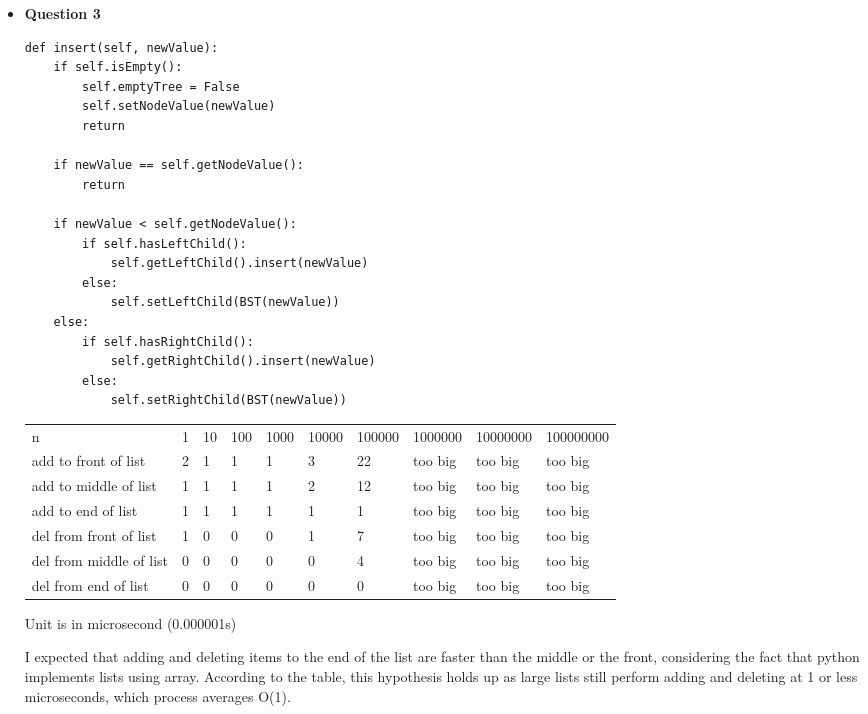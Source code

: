 \documentclass{article}
\begin{document}
\begin{itemize}
\begin{enumerate}
        \end{enumerate}

    \item\textbf{ Question 3}

    \begin{lstlisting}
def insert(self, newValue):
    if self.isEmpty():
        self.emptyTree = False
        self.setNodeValue(newValue)
        return

    if newValue == self.getNodeValue():
        return

    if newValue < self.getNodeValue():
        if self.hasLeftChild():
            self.getLeftChild().insert(newValue)
        else:
            self.setLeftChild(BST(newValue))
    else:
        if self.hasRightChild():
            self.getRightChild().insert(newValue)
        else:
            self.setRightChild(BST(newValue))

    \end{lstlisting}
    \pagebreak
    \begin{table}[]
        \begin{tabular}{llllllllll}
            n                       & 1 & 10 & 100 & 1000 & 10000 & 100000 & 1000000 & 10000000 & 100000000 \\
            add to front of list    & 2 & 1  & 1   & 1    & 3     & 22     & too big & too big  & too big   \\
            add to middle of list   & 1 & 1  & 1   & 1    & 2     & 12     & too big & too big  & too big   \\
            add to end of list      & 1 & 1  & 1   & 1    & 1     & 1      & too big & too big  & too big   \\
            del from front of list  & 1 & 0  & 0   & 0    & 1     & 7      & too big & too big  & too big   \\
            del from middle of list & 0 & 0  & 0   & 0    & 0     & 4      & too big & too big  & too big   \\
            del from end of list    & 0 & 0  & 0   & 0    & 0     & 0      & too big & too big  & too big  
        \end{tabular}
    \end{table}

    Unit is in microsecond (0.000001s)

    I expected that adding and deleting items to the end of the list are faster than the middle or the front, considering the fact that python implements lists using array. According to the table, this hypothesis holds up as large lists still perform adding and deleting at 1 or less microseconds, which process averages O(1).
\end{itemize}
\end{document}

